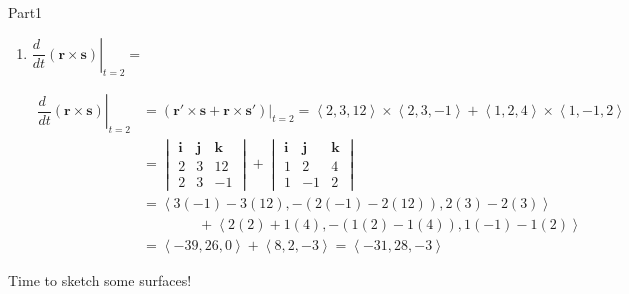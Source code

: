 \documentclass{report}
\newcommand{\avec}[1]{\left\langle #1 \right\rangle}
\begin{document}
\begin{exam}{Part1}
\begin{problem*}[\auto]
\begin{parts}
\begin{enumerate}
\item $\left.\dfrac{d\phantom{t}}{dt}\left(\mathbf{r} \times \mathbf{s} \right)\right|_{t=2}= $ \fillin[b]{1in}{ $\boxed{\avec{-31,28,-3}}$}
\begin{solution}[0.5in]
\begin{align*}
\left.\dfrac{d\phantom{t}}{dt}\left(\mathbf{r} \times \mathbf{s} \right)\right|_{t=2}&= (\mathbf{r'}\times\mathbf{s}+\mathbf{r}\times\mathbf{s'})\Big|_{t=2}=\avec{2,3,12}\times\avec{2,3,-1}+\avec{1,2,4}\times\avec{1,-1,2}\\
&=\begin{vmatrix}
\mathbf{i} & \mathbf{j} & \mathbf{k} \\
2 & 3 & 12 \\
2 & 3 & -1
\end{vmatrix}+\begin{vmatrix}
\mathbf{i} & \mathbf{j} & \mathbf{k} \\
1 & 2 & 4 \\
1 & -1 & 2
\end{vmatrix} \\
&=\avec{3(-1)-3(12),-(2(-1)-2(12)),2(3)-2(3)}\\
&\qquad\qquad+\avec{2(2)+1(4),-(1(2)-1(4)),1(-1)-1(2)}\\
&=\avec{-39,26,0}+\avec{8,2,-3}=\avec{-31,28,-3}
\end{align*}
\end{solution}
\end{enumerate}
\end{parts}
\end{problem*}

\begin{problem*}[\auto] Time to sketch some surfaces!

\begin{parts}




\end{parts}
\end{problem*}
\end{exam}
\end{document}
